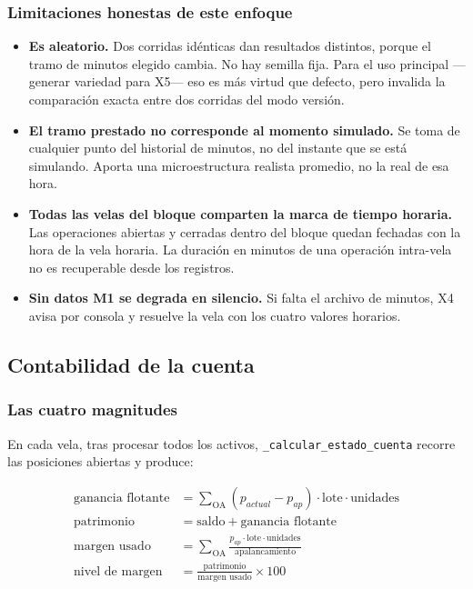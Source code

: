 \documentclass[11pt,a4paper]{article}
\newcommand{\code}[1]{\texttt{\small #1}}
\begin{document}
\subsubsection{Limitaciones honestas de este enfoque}

\begin{itemize}[leftmargin=1.4em,itemsep=2pt]
\item \textbf{Es aleatorio.} Dos corridas idénticas dan resultados distintos, porque el
tramo de minutos elegido cambia. No hay semilla fija. Para el uso principal —generar
variedad para X5— eso es más virtud que defecto, pero invalida la comparación exacta entre
dos corridas del modo versión.
\item \textbf{El tramo prestado no corresponde al momento simulado.} Se toma de cualquier
punto del historial de minutos, no del instante que se está simulando. Aporta una
microestructura realista promedio, no la real de esa hora.
\item \textbf{Todas las velas del bloque comparten la marca de tiempo horaria.} Las
operaciones abiertas y cerradas dentro del bloque quedan fechadas con la hora de la vela
horaria. La duración en minutos de una operación intra-vela no es recuperable desde los
registros.
\item \textbf{Sin datos M1 se degrada en silencio.} Si falta el archivo de minutos, X4
avisa por consola y resuelve la vela con los cuatro valores horarios.
\end{itemize}

\subsection{Contabilidad de la cuenta}

\subsubsection{Las cuatro magnitudes}

En cada vela, tras procesar todos los activos, \code{_calcular_estado_cuenta} recorre las
posiciones abiertas y produce:

\begin{align*}
\text{ganancia flotante} &= \textstyle\sum_{\text{OA}} (p_{actual} - p_{ap}) \cdot \text{lote} \cdot \text{unidades} \\
\text{patrimonio} &= \text{saldo} + \text{ganancia flotante} \\
\text{margen usado} &= \textstyle\sum_{\text{OA}} \frac{p_{ap} \cdot \text{lote} \cdot \text{unidades}}{\text{apalancamiento}} \\
\text{nivel de margen} &= \frac{\text{patrimonio}}{\text{margen usado}} \times 100
\end{align*}
\end{document}
